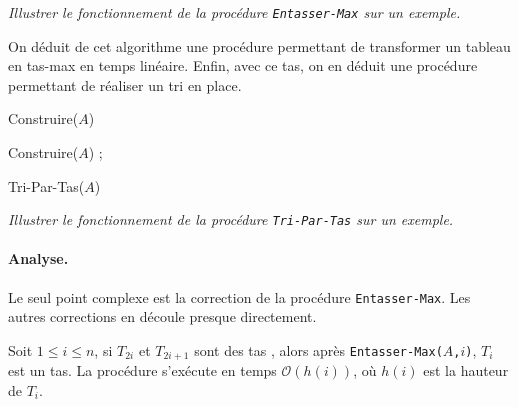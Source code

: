 \begin{center}
\textit{Illustrer le fonctionnement de la procédure {\tt Entasser-Max} sur un exemple.}\newline
\end{center}

On déduit de cet algorithme une procédure permettant de transformer un tableau en tas-max en temps linéaire. Enfin, avec ce tas, on en déduit une procédure permettant de réaliser un tri en place.

\begin{algorithm}
\caption{Construire($A$)}
\end{algorithm}

\begin{algorithm}
Construire($A$) ;\\
\caption{Tri-Par-Tas($A$)}
\end{algorithm}

\begin{center}
\textit{Illustrer le fonctionnement de la procédure {\tt Tri-Par-Tas} sur un exemple.}
\end{center}

\paragraph{Analyse.} Le seul point complexe est la correction de la procédure {\tt Entasser-Max}. Les autres corrections en découle presque directement.

\begin{lemma}\label{lemme 1}
Soit $1\leq i \leq n$, si $T_{2i}$ et $T_{2i+1}$ sont des tas , alors après {\tt Entasser-Max($A$,$i$)}, $T_i$ est un tas. La procédure s'exécute en temps $\mathcal{O}(h(i))$, où $h(i)$ est la hauteur de $T_i$.
\end{lemma}

